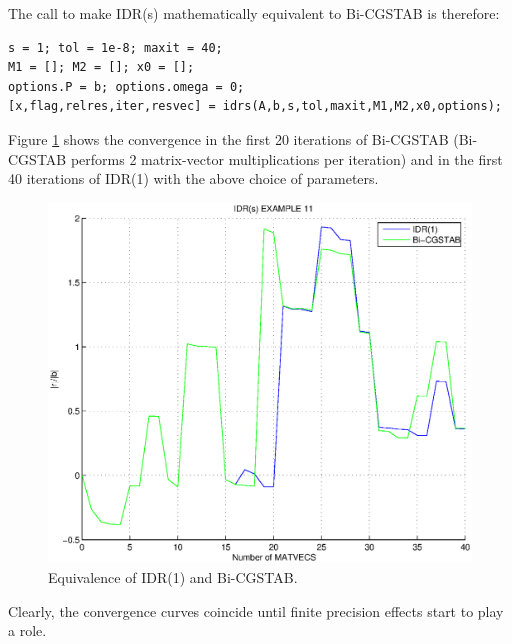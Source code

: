 \documentclass[prodmode,acmtoms]{acmsmall}
\begin{document}
The call to make IDR(s) mathematically equivalent to Bi-CGSTAB is therefore:
\begin{verbatim}
s = 1; tol = 1e-8; maxit = 40;
M1 = []; M2 = []; x0 = [];
options.P = b; options.omega = 0;
[x,flag,relres,iter,resvec] = idrs(A,b,s,tol,maxit,M1,M2,x0,options);
\end{verbatim}
 
Figure \ref{fig:example11} shows the convergence in the first 20 iterations of Bi-CGSTAB (Bi-CGSTAB performs 2
matrix-vector multiplications per iteration)  and in the first 40 iterations of IDR(1) with the above  choice of 
parameters.
\begin{figure}
\centering
\includegraphics[width=.60\linewidth]{example11}
\caption{Equivalence of IDR(1) and Bi-CGSTAB.}
\label{fig:example11}
\end{figure}
Clearly, the convergence curves coincide until finite precision effects start to play a role. 
\end{document}
